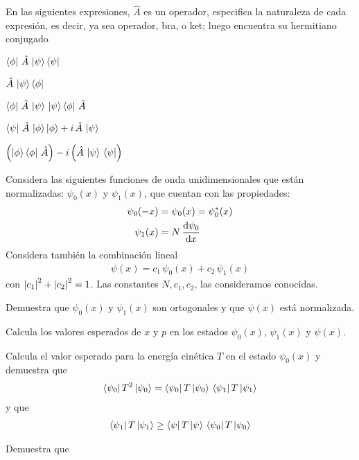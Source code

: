 \begin{milista}
\item En las siguientes expresiones, $\hat{A}$ es un operador, especifica la naturaleza de cada expresión, es decir, ya sea operador, bra, o ket; luego encuentra su hermitiano conjugado
\begin{milista}
\item $\bra{\phi} \, \hat{A} \, \ket{\psi} \bra{\psi}$
\item $\hat{A} \, \ket{\psi} \bra{\phi}$
\item $\bra{\phi} \, \hat{A} \, \ket{\psi} \, \ket{\psi} \bra{\phi} \, \hat{A}$
\item $\bra{\psi} \, \hat{A} \, \ket{\phi} \ket{\phi} + i \, \hat{A} \, \ket{\psi}$
\item $\left( \ket{\phi} \bra{\phi} \, \hat{A} \right) - i \left( \hat{A} \, \ket{\psi} \, \bra{\psi} \right)$
\end{milista}
\item Considera las siguientes funciones de onda unidimensionales que están normalizadas: $\psi_{0}(x)$ y $\psi_{1}(x)$, que cuentan con las propiedades:
\begin{align*}
\psi_{0}(-x) &= \psi_{0}(x) = \psi_{0}^{*} (x) \\
\psi_{1}(x) &= N \, \dv{\psi_{0}}{x}
\end{align*}
Considera también la combinación lineal
\begin{align*}
\psi(x) = c_{1} \, \psi_{0}(x) + c_{2} \, \psi_{1} (x)
\end{align*}
con $\abs{c_{1}}^{2} + \abs{c_{2}}^{2} = 1$. Las constantes $N, c_{1}, c_{2}$, las consideramos conocidas.
\begin{milista}
\item Demuestra que $\psi_{0}(x)$ y $\psi_{1}(x)$ son ortogonales y que $\psi(x)$ está normalizada.
\item Calcula los valores esperados de $x$ y $p$ en los estados $\psi_{0}(x)$, $\psi_{1}(x)$ y $\psi(x)$.
\item Calcula el valor esperado para la energía cinética $T$ en el estado $\psi_{0}(x)$ y demuestra que
\begin{align*}
\bra{\psi_{0}} T^{2} \ket{\psi_{0}} = \bra{\psi_{0}} T \ket{\psi_{0}} \, \bra{\psi_{1}} T \ket{\psi_{1}}
\end{align*}
y que 
\begin{align*}
\bra{\psi_{1}} T \ket{\psi_{1}} \geq \bra{\psi} T \ket{\psi} \, \bra{\psi_{0}} T \ket{\psi_{0}}
\end{align*}
\item Demuestra que

\end{milista}
\end{milista}
